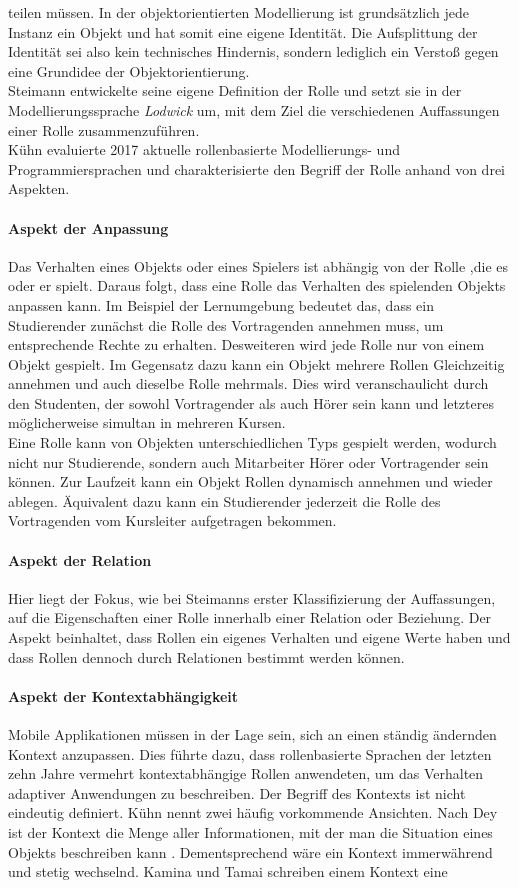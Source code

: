 \documentclass[conference]{IEEEtran}
\begin{document}
teilen müssen. In der objektorientierten Modellierung ist grundsätzlich jede Instanz ein Objekt und hat somit eine eigene Identität. Die Aufsplittung der Identität sei also kein technisches Hindernis, sondern lediglich ein Verstoß gegen eine Grundidee der Objektorientierung. \\ Steimann entwickelte seine eigene Definition der Rolle und setzt sie in der Modellierungssprache \textit{Lodwick} um, mit dem Ziel die verschiedenen Auffassungen einer Rolle zusammenzuführen. \\Kühn evaluierte 2017 aktuelle rollenbasierte Modellierungs- und Programmiersprachen und charakterisierte den Begriff der Rolle anhand von drei Aspekten\cite{family}. \paragraph{Aspekt der Anpassung} Das Verhalten eines Objekts oder eines Spielers ist abhängig von der Rolle ,die es oder er spielt. Daraus folgt, dass eine Rolle das Verhalten des spielenden Objekts anpassen kann. Im Beispiel der Lernumgebung bedeutet das, dass ein Studierender zunächst die Rolle des Vortragenden annehmen muss, um entsprechende Rechte zu erhalten. Desweiteren wird jede Rolle nur von einem Objekt gespielt. Im Gegensatz dazu kann ein Objekt mehrere Rollen Gleichzeitig annehmen und auch dieselbe Rolle mehrmals. Dies wird veranschaulicht durch den Studenten, der sowohl Vortragender als auch Hörer sein kann und letzteres möglicherweise simultan in mehreren Kursen.\\ Eine Rolle kann von Objekten unterschiedlichen Typs gespielt werden, wodurch nicht nur Studierende, sondern auch Mitarbeiter Hörer oder Vortragender sein können. Zur Laufzeit kann ein Objekt Rollen dynamisch annehmen und wieder ablegen. Äquivalent dazu kann ein Studierender jederzeit die Rolle des Vortragenden vom Kursleiter aufgetragen bekommen.\paragraph{Aspekt der Relation} Hier liegt der Fokus, wie bei Steimanns erster Klassifizierung der Auffassungen, auf die Eigenschaften einer Rolle innerhalb einer Relation oder Beziehung. Der Aspekt beinhaltet, dass Rollen ein eigenes Verhalten und eigene Werte haben und dass Rollen dennoch durch Relationen bestimmt werden können.  \paragraph{Aspekt der Kontextabhängigkeit} Mobile Applikationen müssen in der Lage sein, sich an einen ständig ändernden Kontext anzupassen. Dies führte dazu, dass rollenbasierte Sprachen der letzten zehn Jahre vermehrt kontextabhängige Rollen anwendeten, um das Verhalten adaptiver Anwendungen zu beschreiben. Der Begriff des Kontexts ist nicht eindeutig definiert. Kühn nennt zwei häufig vorkommende Ansichten. Nach Dey ist der Kontext die Menge aller Informationen, mit der man die Situation eines Objekts beschreiben kann \cite{dey2001understanding}. Dementsprechend wäre ein Kontext immerwährend und stetig wechselnd. Kamina und Tamai schreiben einem Kontext eine 
\end{document}
